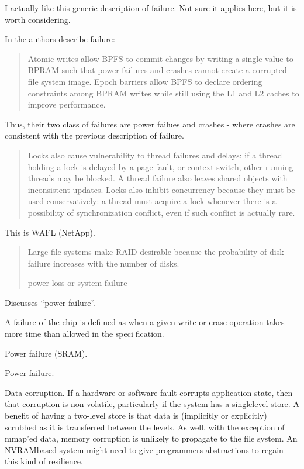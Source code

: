 I actually like this generic description of failure.  Not sure it applies here, but it is worth considering.

In \cite{condit2009better} the authors describe failure:

\begin{quotation}
    Atomic writes allow BPFS to commit changes by
    writing a single value to BPRAM such that power failures and
    crashes cannot create a corrupted file system image. Epoch barriers
    allow BPFS to declare ordering constraints among BPRAM writes
    while still using the L1 and L2 caches to improve performance.
\end{quotation}

Thus, their two class of failures are power failues and crashes - where crashes are consistent with the previous description of failure.

\cite{rajwar2005virtualizing}

\begin{quotation}
    Locks also cause vulnerability
to thread failures and delays: if a thread holding a
lock is delayed by a page fault, or context switch, other
running threads may be blocked. A thread failure also
leaves shared objects with inconsistent updates. Locks
also inhibit concurrency because they must be used conservatively:
a thread must acquire a lock whenever there is
a possibility of synchronization conflict, even if such conflict
is actually rare.
\end{quotation}


\cite{hitz1994file}

This is WAFL (NetApp).

\begin{quotation}
    Large file systems make RAID
    desirable because the probability of disk failure increases with the number of disks.

    power loss or system failure
\end{quotation}

\cite{wu1994envy}

Discusses ``power failure''.

A failure of the chip is defined as when a given write or
erase operation takes more time than allowed in the
specification.

Power failure (SRAM).

\cite{bailey2011operating}

Power failure.

Data corruption. If a hardware or software fault
corrupts application state, then that corruption is
non-volatile, particularly if the system has a singlelevel
store. A benefit of having a two-level store is
that data is (implicitly or explicitly) scrubbed as it is
transferred between the levels. As well, with the exception
of mmap’ed data, memory corruption is unlikely
to propagate to the file system. An NVRAMbased
system might need to give programmers abstractions
to regain this kind of resilience.

